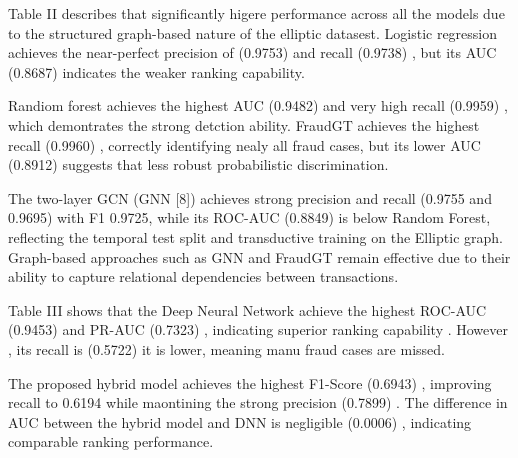 \documentclass[conference]{IEEEtran}
\begin{document}
Table II describes that significantly higere performance across all the models due to the structured graph-based nature of the elliptic datasest. Logistic regression achieves the near-perfect precision of (0.9753) and recall (0.9738) , but its AUC (0.8687) indicates the weaker ranking capability.

Randiom forest achieves the highest AUC (0.9482) and very high recall (0.9959) , which demontrates the strong detction ability. FraudGT achieves the highest recall (0.9960) , correctly identifying nealy all fraud cases, but its lower AUC (0.8912) suggests that less robust probabilistic discrimination.

The two-layer GCN (GNN [8]) achieves strong precision and recall (0.9755 and 0.9695) with F1 0.9725, while its ROC-AUC (0.8849) is below Random Forest, reflecting the temporal test split and transductive training on the Elliptic graph. Graph-based approaches such as GNN and FraudGT remain effective due to their ability to capture relational dependencies between transactions.



\vspace{0.5em}

\begin{table}[h]
\centering
\caption{Model Comparison Results}
\end{table}
Table III shows that the Deep Neural Network achieve the highest ROC-AUC (0.9453) and PR-AUC (0.7323) , indicating superior ranking capability . However , its recall is (0.5722) it is lower, meaning manu fraud cases are missed.


The proposed hybrid model achieves the highest F1-Score (0.6943) , improving recall to 0.6194 while maontining the strong precision (0.7899) . The difference in AUC between the hybrid model and DNN is negligible (0.0006) , indicating comparable ranking performance.
\end{document}
